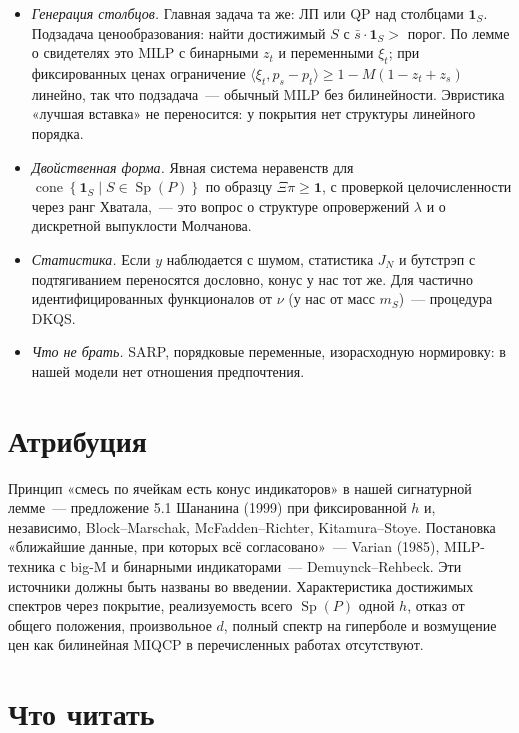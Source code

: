 \documentclass[a4paper,11pt]{article}
\theoremstyle{plain}
\theoremstyle{definition}
\theoremstyle{remark}
\newcommand{\set}[1]{\left\{ #1 \right\}}
\newcommand{\ip}[2]{\langle #1, #2\rangle} %
\DeclareMathOperator{\cone}{cone}
\DeclareMathOperator{\Sp}{Sp}
\begin{document}
\begin{itemize}
    \item \emph{Генерация столбцов.} Главная задача та же: ЛП или QP над столбцами $\mathbf 1_S$. Подзадача ценообразования: найти достижимый $S$ с $\bar s\cdot\mathbf 1_S>$ порог. По лемме о свидетелях это MILP с бинарными $z_t$ и переменными $\xi_t$; при фиксированных ценах ограничение $\ip{\xi_t}{p_s-p_t}\ge1-M(1-z_t+z_s)$ линейно, так что подзадача~--- обычный MILP без билинейности. Эвристика «лучшая вставка» не переносится: у покрытия нет структуры линейного порядка.
    \item \emph{Двойственная форма.} Явная система неравенств для $\cone\set{\mathbf 1_S\mid S\in\Sp(P)}$ по образцу $\Xi\pi\ge\mathbf 1$, с проверкой целочисленности через ранг Хватала,~--- это вопрос о структуре опровержений $\lambda$ и о дискретной выпуклости Молчанова.
    \item \emph{Статистика.} Если $y$ наблюдается с шумом, статистика $J_N$ и бутстрэп с подтягиванием переносятся дословно, конус у нас тот же. Для частично идентифицированных функционалов от $\nu$ (у нас от масс $m_S$)~--- процедура DKQS.
    \item \emph{Что не брать.} SARP, порядковые переменные, изорасходную нормировку: в нашей модели нет отношения предпочтения.
\end{itemize}

\section{Атрибуция}

Принцип «смесь по ячейкам есть конус индикаторов» в нашей сигнатурной лемме~--- предложение 5.1 Шананина (1999) при фиксированной $h$ и, независимо, Block--Marschak, McFadden--Richter, Kitamura--Stoye. Постановка «ближайшие данные, при которых всё согласовано»~--- Varian (1985), MILP-техника с big-M и бинарными индикаторами~--- Demuynck--Rehbeck. Эти источники должны быть названы во введении. Характеристика достижимых спектров через покрытие, реализуемость всего $\Sp(P)$ одной $h$, отказ от общего положения, произвольное $d$, полный спектр на гиперболе и возмущение цен как билинейная MIQCP в перечисленных работах отсутствуют.

\section*{Что читать}
\end{document}
